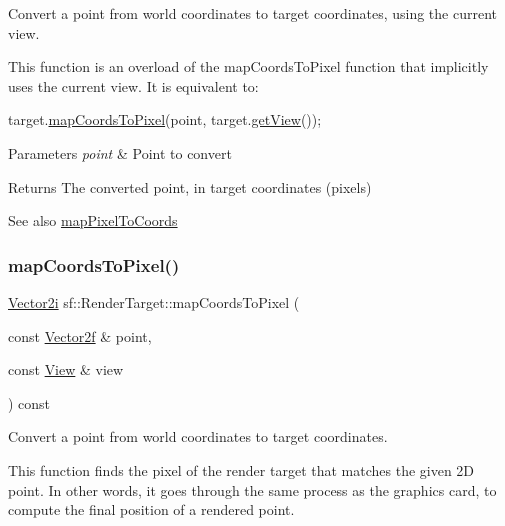 Convert a point from world coordinates to target coordinates, using the current view. 

This function is an overload of the map\+Coords\+To\+Pixel function that implicitly uses the current view. It is equivalent to\+: 
\begin{DoxyCode}
target.\hyperlink{classsf_1_1_render_target_ad92a9f0283aa5f3f67e473c1105b68cf}{mapCoordsToPixel}(point, target.\hyperlink{classsf_1_1_render_target_a2c179503b4dcdf5282ef6426d317602c}{getView}());
\end{DoxyCode}



\begin{DoxyParams}{Parameters}
{\em point} & Point to convert\\
\hline
\end{DoxyParams}
\begin{DoxyReturn}{Returns}
The converted point, in target coordinates (pixels)
\end{DoxyReturn}
\begin{DoxySeeAlso}{See also}
\hyperlink{classsf_1_1_render_target_a0103ebebafa43a97e6e6414f8560d5e3}{map\+Pixel\+To\+Coords} 
\end{DoxySeeAlso}
\mbox{\label{classsf_1_1_render_target_a848eee44b72ac3f16fa9182df26e83bc}} 
\subsubsection{\texorpdfstring{map\+Coords\+To\+Pixel()}{mapCoordsToPixel()}\hspace{0.1cm}{\footnotesize\ttfamily [2/2]}}
{\footnotesize\ttfamily \hyperlink{classsf_1_1_vector2}{Vector2i} sf\+::\+Render\+Target\+::map\+Coords\+To\+Pixel (\begin{DoxyParamCaption}\item[{const \hyperlink{classsf_1_1_vector2}{Vector2f} \&}]{point,  }\item[{const \hyperlink{classsf_1_1_view}{View} \&}]{view }\end{DoxyParamCaption}) const}



Convert a point from world coordinates to target coordinates. 

This function finds the pixel of the render target that matches the given 2D point. In other words, it goes through the same process as the graphics card, to compute the final position of a rendered point.


